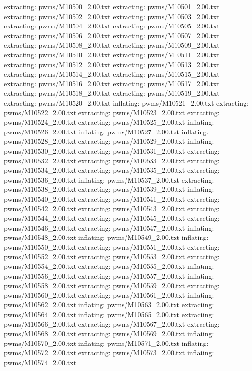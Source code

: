 \documentclass[letterpaper,10pt,english]{sphinxmanual}
\begin{document}
{\begin{sphinxVerbatim}[commandchars=\\\{\}]
 extracting: pwms/M10500\_2.00.txt
 extracting: pwms/M10501\_2.00.txt
 extracting: pwms/M10502\_2.00.txt
 extracting: pwms/M10503\_2.00.txt
 extracting: pwms/M10504\_2.00.txt
 extracting: pwms/M10505\_2.00.txt
 extracting: pwms/M10506\_2.00.txt
 extracting: pwms/M10507\_2.00.txt
 extracting: pwms/M10508\_2.00.txt
 extracting: pwms/M10509\_2.00.txt
 extracting: pwms/M10510\_2.00.txt
 extracting: pwms/M10511\_2.00.txt
 extracting: pwms/M10512\_2.00.txt
 extracting: pwms/M10513\_2.00.txt
 extracting: pwms/M10514\_2.00.txt
 extracting: pwms/M10515\_2.00.txt
 extracting: pwms/M10516\_2.00.txt
 extracting: pwms/M10517\_2.00.txt
 extracting: pwms/M10518\_2.00.txt
 extracting: pwms/M10519\_2.00.txt
 extracting: pwms/M10520\_2.00.txt
  inflating: pwms/M10521\_2.00.txt
 extracting: pwms/M10522\_2.00.txt
 extracting: pwms/M10523\_2.00.txt
 extracting: pwms/M10524\_2.00.txt
 extracting: pwms/M10525\_2.00.txt
  inflating: pwms/M10526\_2.00.txt
  inflating: pwms/M10527\_2.00.txt
  inflating: pwms/M10528\_2.00.txt
 extracting: pwms/M10529\_2.00.txt
  inflating: pwms/M10530\_2.00.txt
 extracting: pwms/M10531\_2.00.txt
 extracting: pwms/M10532\_2.00.txt
 extracting: pwms/M10533\_2.00.txt
 extracting: pwms/M10534\_2.00.txt
 extracting: pwms/M10535\_2.00.txt
 extracting: pwms/M10536\_2.00.txt
  inflating: pwms/M10537\_2.00.txt
 extracting: pwms/M10538\_2.00.txt
 extracting: pwms/M10539\_2.00.txt
  inflating: pwms/M10540\_2.00.txt
 extracting: pwms/M10541\_2.00.txt
 extracting: pwms/M10542\_2.00.txt
 extracting: pwms/M10543\_2.00.txt
 extracting: pwms/M10544\_2.00.txt
 extracting: pwms/M10545\_2.00.txt
 extracting: pwms/M10546\_2.00.txt
 extracting: pwms/M10547\_2.00.txt
  inflating: pwms/M10548\_2.00.txt
  inflating: pwms/M10549\_2.00.txt
  inflating: pwms/M10550\_2.00.txt
 extracting: pwms/M10551\_2.00.txt
 extracting: pwms/M10552\_2.00.txt
 extracting: pwms/M10553\_2.00.txt
 extracting: pwms/M10554\_2.00.txt
 extracting: pwms/M10555\_2.00.txt
  inflating: pwms/M10556\_2.00.txt
 extracting: pwms/M10557\_2.00.txt
  inflating: pwms/M10558\_2.00.txt
 extracting: pwms/M10559\_2.00.txt
 extracting: pwms/M10560\_2.00.txt
 extracting: pwms/M10561\_2.00.txt
  inflating: pwms/M10562\_2.00.txt
  inflating: pwms/M10563\_2.00.txt
 extracting: pwms/M10564\_2.00.txt
  inflating: pwms/M10565\_2.00.txt
 extracting: pwms/M10566\_2.00.txt
 extracting: pwms/M10567\_2.00.txt
 extracting: pwms/M10568\_2.00.txt
 extracting: pwms/M10569\_2.00.txt
  inflating: pwms/M10570\_2.00.txt
  inflating: pwms/M10571\_2.00.txt
  inflating: pwms/M10572\_2.00.txt
 extracting: pwms/M10573\_2.00.txt
  inflating: pwms/M10574\_2.00.txt

\end{sphinxVerbatim}}
\end{document}
